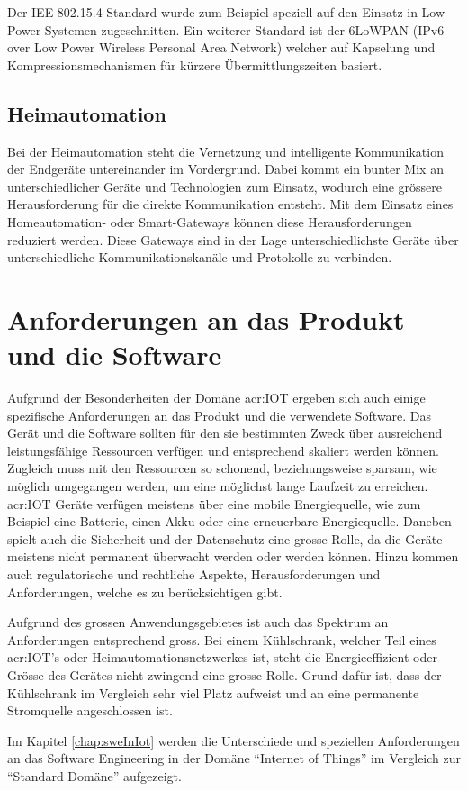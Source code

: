 Der IEE 802.15.4 Standard wurde zum Beispiel speziell auf den Einsatz in Low-Power-Systemen zugeschnitten. Ein weiterer Standard ist der 6LoWPAN (IPv6 over Low Power Wireless Personal Area Network) welcher auf Kapselung und Kompressionsmechanismen für kürzere Übermittlungszeiten basiert.


\subsection{Heimautomation} 
Bei der Heimautomation steht die Vernetzung und intelligente Kommunikation der Endgeräte untereinander im Vordergrund. Dabei kommt ein bunter Mix an unterschiedlicher Geräte und Technologien zum Einsatz, wodurch eine grössere Herausforderung für die direkte Kommunikation entsteht. Mit dem Einsatz eines Homeautomation- oder Smart-Gateways können diese Herausforderungen reduziert werden. Diese Gateways sind in der Lage unterschiedlichste Geräte über unterschiedliche Kommunikationskanäle und Protokolle zu verbinden.



\section{Anforderungen an das Produkt und die Software}
Aufgrund der Besonderheiten der Domäne \gls{acr:IOT} ergeben sich auch einige spezifische Anforderungen an das Produkt und die verwendete Software. Das Gerät und die Software sollten für den sie bestimmten Zweck über ausreichend leistungsfähige Ressourcen verfügen und entsprechend skaliert werden können.  Zugleich muss mit den Ressourcen so schonend, beziehungsweise sparsam, wie möglich umgegangen werden, um eine möglichst lange Laufzeit zu erreichen. \gls{acr:IOT} Geräte verfügen meistens über eine mobile Energiequelle, wie zum Beispiel eine Batterie, einen Akku oder eine erneuerbare Energiequelle. Daneben spielt auch die Sicherheit und der Datenschutz eine grosse Rolle, da die Geräte meistens nicht permanent überwacht werden oder werden können. Hinzu kommen auch regulatorische und rechtliche Aspekte, Herausforderungen und Anforderungen, welche es zu berücksichtigen gibt.

Aufgrund des grossen Anwendungsgebietes ist auch das Spektrum an Anforderungen entsprechend gross. Bei einem Kühlschrank, welcher Teil eines \gls{acr:IOT}'s oder Heimautomationsnetzwerkes ist, steht die Energieeffizient oder Grösse des Gerätes nicht zwingend eine grosse Rolle. Grund dafür ist, dass der Kühlschrank im Vergleich sehr viel Platz aufweist und an eine permanente Stromquelle angeschlossen ist.

Im Kapitel \ref{chap:sweInIot}  werden die Unterschiede und speziellen Anforderungen an das Software Engineering in der Domäne "`Internet of Things"' im Vergleich zur "`Standard Domäne"' aufgezeigt.
